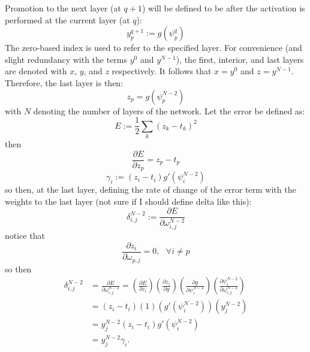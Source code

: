 \documentclass{article}
\begin{document}
Promotion to the next layer (at $q+1$) will be defined to be after the activation is performed at the current layer (at $q$):
%
\begin{equation} \label{eq:z}
y_p^{q+1} := g(\psi_p^q)
\end{equation}
%
The zero-based index is used to refer to the specified layer.
For convenience (and slight redundancy with the terms $y^0$ and $y^{N-1}$), the first, interior, and last layers are denoted with $x$, $y$, and $z$ respectively.
It follows that $x = y^0$ and $z = y^{N-1}$.
Therefore, the last layer is then:
%
\begin{equation} \label{eq:z}
z_p = g(\psi_p^{N-2})
\end{equation}
%
with $N$ denoting the number of layers of the network.
%
Let the error be defined as:
%
\begin{equation} \label{eq:error}
E := \frac{1}{2} \sum_k (z_k - t_k)^2
\end{equation}
%
then
%
\begin{equation} \label{eq:derror}
\frac{\partial E}{\partial z_p} = z_p - t_p
\end{equation}
%
\begin{equation} \label{eq:gamma}
\gamma_i := (z_i - t_i) g'(\psi_i^{N-2})
\end{equation}
%
so then, at the last layer, defining the rate of change of the error term with the weights to the last layer (not sure if I should define delta like this):
%
\begin{equation} \label{eq:delta}
\delta_{i,j}^{N-2} := \frac{\partial E}{\partial \omega_{i,j}^{N-2}}
\end{equation}
%
notice that
%
\begin{equation} \label{eq:last_layer_derror_eq_0}
\frac{\partial z_i}{\partial \omega_{p,j}} = 0, \ \ \ \forall i \neq p
\end{equation}
%
so then
%
\begin{equation} \label{eq:last_layer_derror}
\begin{aligned}
\delta_{i,j}^{N-2} &=
\frac{\partial E}{\partial \omega_{i,j}^{N-2}} =
\left( \frac{\partial E}{\partial z_i} \right)
\left( \frac{\partial z_i}{\partial g} \right)
\left( \frac{\partial g}{\partial \psi_i^{N-2}} \right)
\left( \frac{\partial \psi_i^{N-2}}{\partial \omega_{i, j}^{N-2}} \right) \\
&=
\left( z_i - t_i \right)
\left( 1 \right)
\left( g' (\psi_i^{N-2}) \right)
\left( y_j^{N-2} \right) \\
&=
y_j^{N-2}
\left( z_i - t_i \right)
g' (\psi_i^{N-2}) \\
&=
y_j^{N-2}
\gamma_i.
\end{aligned}
\end{equation}
\end{document}
